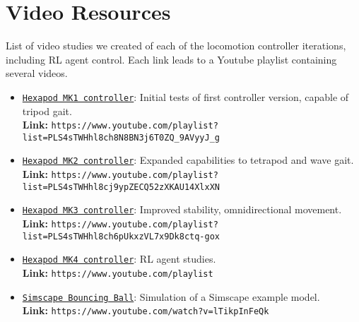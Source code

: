 \chapter*{Video Resources}

List of video studies we created of each of the locomotion controller iterations, including RL agent control.
Each link leads to a Youtube playlist containing several videos.

\begin{itemize} 
	\item \href{https://www.youtube.com/playlist?list=PLS4sTWHhl8ch8N8BN3j6T0ZQ_9AVyyJ_g}{\texttt{Hexapod MK1 controller}}: Initial tests of first controller version, capable of tripod gait. \\
																						  \textbf{Link:} \nolinkurl{https://www.youtube.com/playlist?list=PLS4sTWHhl8ch8N8BN3j6T0ZQ_9AVyyJ_g} \label{vid: MK1}
	
	\item \href{https://www.youtube.com/playlist?list=PLS4sTWHhl8cj9ypZECQ52zXKAU14XlxXN}{\texttt{Hexapod MK2 controller}}: Expanded capabilities to tetrapod and wave gait. \\
																						  \textbf{Link:} \nolinkurl{https://www.youtube.com/playlist?list=PLS4sTWHhl8cj9ypZECQ52zXKAU14XlxXN} \label{vid: MK2}
	
	\item \href{https://www.youtube.com/playlist?list=PLS4sTWHhl8ch6pUkxzVL7x9Dk8ctq-gox}{\texttt{Hexapod MK3 controller}}: Improved stability, omnidirectional movement. \\
																						  \textbf{Link:} \nolinkurl{https://www.youtube.com/playlist?list=PLS4sTWHhl8ch6pUkxzVL7x9Dk8ctq-gox} \label{vid: MK3}
	
	\item \href{}{\texttt{Hexapod MK4 controller}}: RL agent studies. \\
	\textbf{Link:} \nolinkurl{https://www.youtube.com/playlist} \label{vid: MK4}
	
	
	\item \href{https://www.youtube.com/watch?v=lTikpInFeQk}{\texttt{Simscape Bouncing Ball}}: Simulation of a Simscape example model. \\
															 \textbf{Link:} \nolinkurl{https://www.youtube.com/watch?v=lTikpInFeQk} \label{vid: Simscape}
\end{itemize}